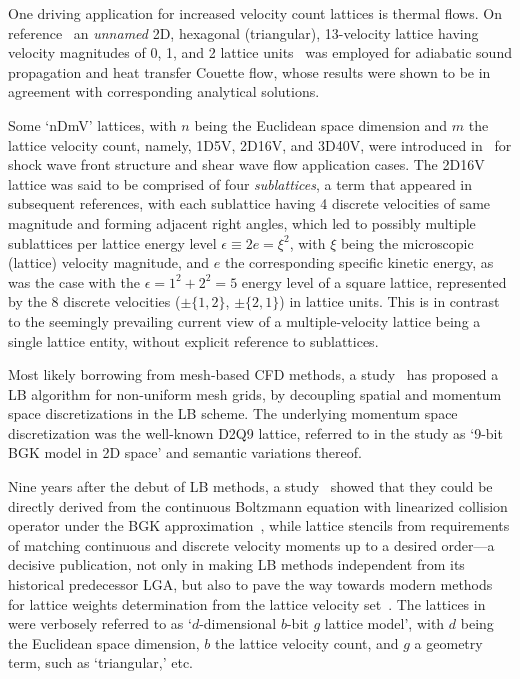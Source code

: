    One    driving    application     for     increased     velocity     count     lattices     is     thermal     flows.     On
    reference~\cite{1993-AlexanderFJ+SterlingJD-PhysRevE} an \emph{unnamed}  2D,  hexagonal  (triangular),  13-velocity  lattice
    having velocity magnitudes of 0,  1,  and  2  lattice  units~\cite{1998-ChenS+DoolenGD-AnnuRevFluidMech}  was  employed  for
    adiabatic sound propagation and heat transfer Couette flow, whose results were shown to be in agreement  with  corresponding
    analytical solutions.

    Some `nDmV' lattices, with $n$ being the Euclidean space dimension and $m$ the lattice velocity count, namely, 1D5V,  2D16V,
    and 3D40V, were introduced in~\cite{1994-ChenY+AkiyamaM-PhysRevE} for  shock  wave  front  structure  and  shear  wave  flow
    application cases. The 2D16V lattice was said to be comprised of four \emph{sublattices}, a term that appeared in subsequent
    references, with each sublattice having 4 discrete velocities of same magnitude and forming adjacent right angles, which led
    to possibly multiple sublattices per lattice energy level $\epsilon \equiv 2e = \xi^2$, with  $\xi$  being  the  microscopic
    (lattice) velocity magnitude, and $e$ the corresponding specific kinetic energy, as was the case with the $\epsilon = 1^2  +
    2^2 = 5$ energy level of a square lattice, represented by the 8 discrete velocities ($\pm\{1,2\}$, $\pm\{2,1\}$) in  lattice
    units. This is in contrast to the seemingly prevailing current view of a multiple-velocity lattice being  a  single  lattice
    entity, without explicit reference to sublattices.

    Most likely borrowing from mesh-based CFD methods, a study~\cite{1996-HeX+DemboM-JComputPhys} has proposed  a  LB  algorithm
    for non-uniform mesh grids, by decoupling spatial and momentum space  discretizations  in  the  LB  scheme.  The  underlying
    momentum space discretization was the well-known D2Q9 lattice, referred to in the study as `9-bit BGK model in 2D space' and
    semantic variations thereof.


    Nine years after the debut of LB methods, a study~\cite{1997-HeX+LuoLS-PhysRevE} showed that they could be directly  derived
    from    the    continuous    Boltzmann    equation    with    linearized    collision     operator     under     the     BGK
    approximation~\cite{2011-HarrisS-Dover}, while lattice stencils  from  requirements  of  matching  continuous  and  discrete
    velocity moments up to a desired order---a decisive publication,  not  only  in  making  LB  methods  independent  from  its
    historical predecessor LGA, but also to pave the way towards modern methods  for  lattice  weights  determination  from  the
    lattice  velocity  set~\cite{2014-MattilaKK+PhilippiPC-SciWorldJ}.  The  lattices   in~\cite{1997-HeX+LuoLS-PhysRevE}   were
    verbosely referred to as `$d$-dimensional $b$-bit $g$ lattice model', with $d$ being the Euclidean space dimension, $b$  the
    lattice velocity count, and $g$ a geometry term, such as `triangular,' etc.

